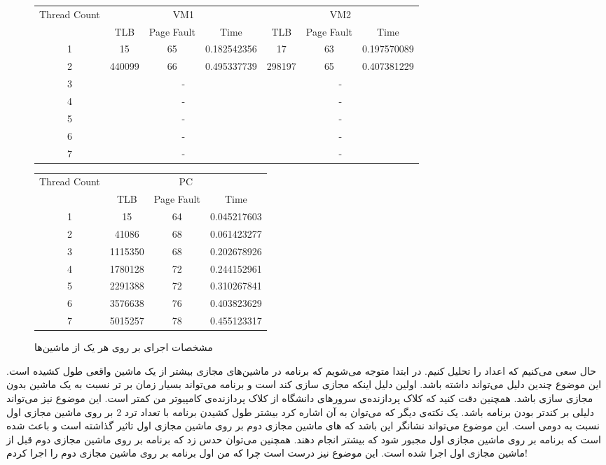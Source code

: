 \begin{figure}[H]
\small
\centering
\begin{latin}
\begin{tabular}{|c|ccc|ccc|}
    \hline
    \multirow{2}{*}{Thread Count} & \multicolumn{3}{|c|}{VM1} & \multicolumn{3}{|c|}{VM2}\\
    & TLB & Page Fault & Time & TLB & Page Fault & Time\\
    \hline
    1 & 15&65&0.182542356 & 17&63&0.197570089\\
    2 & 440099&66&0.495337739 & 298197&65&0.407381229\\
    3 & \multicolumn{3}{|c|}{-} & \multicolumn{3}{|c|}{-}\\
    4 & \multicolumn{3}{|c|}{-} & \multicolumn{3}{|c|}{-}\\
    5 & \multicolumn{3}{|c|}{-} & \multicolumn{3}{|c|}{-}\\
    6 & \multicolumn{3}{|c|}{-} & \multicolumn{3}{|c|}{-}\\
    7 & \multicolumn{3}{|c|}{-} & \multicolumn{3}{|c|}{-}\\
    \hline
\end{tabular}
\begin{tabular}{|c|ccc|}
    \hline
    \multirow{2}{*}{Thread Count} & \multicolumn{3}{|c|}{PC}\\
    & TLB & Page Fault & Time\\
    \hline
    1 & 15&64&0.045217603\\
    2 & 41086&68&0.061423277\\
    3 & 1115350&68&0.202678926\\
    4 & 1780128&72&0.244152961\\
    5 & 2291388&72&0.310267841\\
    6 & 3576638&76&0.403823629\\
    7 & 5015257&78&0.455123317\\
    \hline
\end{tabular}
\end{latin}
\caption{مشخصات اجرای بر روی هر یک از ماشین‌ها}
\end{figure}
حال سعی می‌کنیم که اعداد را تحلیل کنیم. در ابتدا متوجه می‌شویم که برنامه در ماشین‌های مجازی بیشتر از
یک ماشین واقعی طول کشیده است. این موضوع چندین دلیل می‌تواند داشته باشد. اولین دلیل اینکه مجازی سازی کند
است و
برنامه می‌تواند بسیار زمان بر تر نسبت به یک ماشین بدون مجازی سازی باشد. همچنین دقت کنید که کلاک پردازنده‌ی
سرور‌های دانشگاه از کلاک پردازنده‌ی کامپیوتر من کمتر است. این موضوع نیز می‌تواند دلیلی بر کندتر
بودن برنامه باشد. یک نکته‌ی دیگر که می‌توان به آن اشاره کرد بیشتر طول کشیدن برنامه با تعداد ترد 2
بر روی ماشین مجازی اول نسبت به دومی است. این موضوع می‌تواند نشانگر این باشد که
های
ماشین مجازی دوم بر روی ماشین مجازی اول تاثیر گذاشته است و باعث شده است که برنامه‌ بر روی ماشین
مجازی اول مجبور شود که بیشتر 
انجام دهند. همچنین می‌توان حدس زد که برنامه‌ بر روی ماشین مجازی دوم قبل از ماشین مجازی اول اجرا
شده است. این موضوع نیز درست است چرا که من اول برنامه بر روی ماشین مجازی دوم را اجرا کردم!

